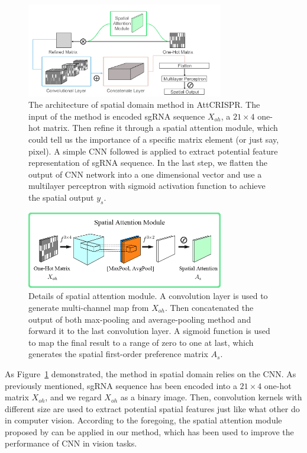 \documentclass{bioinfo}
\begin{document}
\begin{figure}[!tpb]%
    \centerline{\includegraphics[width=86mm]{CNNv2.png}}
    \caption{The architecture of spatial domain method in AttCRISPR. 
    The input of the method is encoded sgRNA sequence $X_{oh}$, a $21\times 4$ one-hot matrix. 
    Then refine it through a spatial attention module, which could tell us the importance of a specific matrix element (or just say, pixel).
    A simple CNN followed is applied to extract potential feature representation of sgRNA sequence.
    In the last step, we flatten the output of CNN network into a one dimensional vector and 
    use a multilayer perceptron with sigmoid activation function to achieve the spatial output $y_s$.}\label{fig:CNN}
\end{figure}

\begin{figure}[!tpb]%
    \centerline{\includegraphics[width=86mm]{spatialmodule.png}}
    \caption{Details of spatial attention module. A convolution layer is used to generate multi-channel map from $X_{oh}$.
    Then concatenated the output of both max-pooling and average-pooling method and forward it to the last convolution layer.
    A sigmoid function is used to map the final result to a range of zero to one at last, 
    which generates the spatial first-order preference matrix $A_s$.
    }\label{fig:spatialmodule}
\end{figure}

As Figure~\ref{fig:CNN} demonstrated, the method in spatial domain relies on the CNN. 
As previously mentioned, sgRNA sequence has been encoded into a $21\times 4$ one-hot matrix $X_{oh}$, and we regard $X_{oh}$ as a binary image. 
Then, convolution kernels with different size are used to extract potential spatial features just like what other do in computer vision. 
According to the foregoing, the spatial attention module proposed by \citeauthor{woo2018cbam:} can be applied in our method, 
which has been used to improve the performance of CNN in vision tasks.
\end{document}
